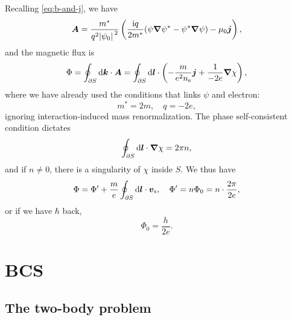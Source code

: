 \documentclass[hyperref, a4paper]{article}
\newcommand*{\ii}{\mathrm{i}}
\begin{document}
Recalling \eqref{eq:b-and-j}, we have 
\begin{equation}
    \vb*{A} = \frac{m^*}{q^2 \abs*{\psi_0}^2} \left(
        \frac{\ii q}{2 m^*} (\psi \grad{\psi^*} - \psi^* \grad{\psi})
        - \mu_0 \vb*{j}
    \right), 
\end{equation}
and the magnetic flux is 
\begin{equation}
    \Phi = \oint_{\partial{S}} \dd{\vb*{k}} \cdot \vb*{A}
    = \oint_{\partial S} \dd{\vb*{l}} \cdot \left(
        - \frac{m}{e^2 n_{\text{s}}} \vb*{j} + \frac{1}{-2e} \grad{\chi}
    \right),
\end{equation}
where we have already used the conditions that links $\psi$ and electron:
\begin{equation}
    m^* = 2 m, \quad q = - 2 e,
\end{equation}
ignoring interaction-induced mass renormalization.
The phase self-consistent condition dictates 
\begin{equation}
    \oint_{\partial S} \dd{\vb*{l}} \cdot \grad{\chi} = 2 \pi n,
\end{equation}
and if $n \neq 0$,
there is a singularity of $\chi$ inside $S$.
We thus have
\begin{equation}
    \Phi = \Phi' + \frac{m}{e} \oint_{\partial S} \dd{\vb*{l}} \cdot \vb*{v}_{\text{s}}, \quad 
    \Phi' = n \Phi_0 = n \cdot \frac{2 \pi}{2e},
\end{equation}
or if we have $\hbar$ back, 
\begin{equation}
    \Phi_0 = \frac{h}{2e}.
\end{equation}

\section{BCS}

\subsection{The two-body problem}
\end{document}
